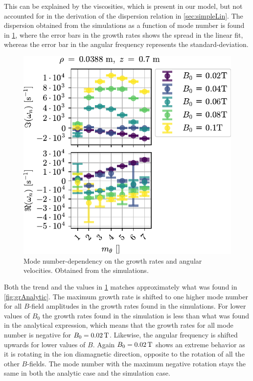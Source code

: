%
This can be explained by the viscosities, which is present in our model, but not accounted for in the derivation of the dispersion relation in \cref{sec:simpleLin}.
The dispersion obtained from the simulations as a function of mode number is found in \cref{fig:grB}, where the error bars in the growth rates shows the spread in the linear fit, whereas the error bar in the angular frequency represents the standard-deviation.
%
\begin{figure}[htb]
        \centering
        \includegraphics{fig/results/growthRates/growthRatesB0}
        \caption{Mode number-dependency on the growth rates and angular velocities.
            Obtained from the simulations.}
        \label{fig:grB}
\end{figure}
%
Both the trend and the values in \cref{fig:grB} matches approximately what was found in \cref{fig:grAnalytic}.
The maximum growth rate is shifted to one higher mode number for all $B$-field amplitudes in the growth rates found in the simulations.
For lower values of $B_0$ the growth rates found in the simulation is less than what was found in the analytical expression, which means that the growth rates for all mode number is negative for $B_0=0.02\, \text{T}$.
Likewise, the angular frequency is shifted upwards for lower values of $B$.
Again $B_0=0.02\, \text{T}$ shows an extreme behavior as it is rotating in the ion diamagnetic direction, opposite to the rotation of all the other $B$-fields.
The mode number with the maximum negative rotation stays the same in both the analytic case and the simulation case.


